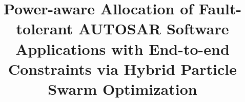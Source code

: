 \documentclass[preprint]{elsarticle}
\begin{document}
\begin{frontmatter}
\title{Power-aware Allocation of Fault-tolerant AUTOSAR Software Applications with End-to-end Constraints via Hybrid Particle Swarm Optimization}


\end{frontmatter}





%
%








\end{document}
